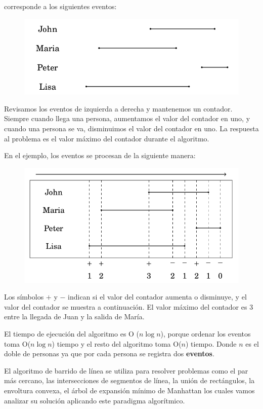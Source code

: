 corresponde a los siguientes eventos:

\begin{figure}[h!]
	\centering
	\includegraphics[width=0.5\linewidth]{img/example_sweep_line}
	\label{fig:examplesweepline}
\end{figure}

Revisamos los eventos de izquierda a derecha y mantenemos un contador. Siempre cuando llega una persona, aumentamos el valor del contador en uno, y cuando una persona se va, disminuimos el valor del contador en uno. La respuesta al problema es el valor máximo del contador durante el algoritmo.

En el ejemplo, los eventos se procesan de la siguiente manera:

\begin{figure}[h!]
	\centering
	\includegraphics[width=0.5\linewidth]{img/example_sweep_line2}
	\label{fig:examplesweepline2}
\end{figure}

Los símbolos $+$ y $-$ indican si el valor del contador aumenta o disminuye, y el valor del contador se muestra a continuación. El valor máximo del contador es 3 entre la llegada de Juan y la salida de María.

El tiempo de ejecución del algoritmo es O ($n\log n$), porque ordenar los eventos toma O($n\log n$) tiempo y el resto del algoritmo toma O($n$) tiempo. Donde $n$ es el doble de personas ya que por cada persona se registra dos \textbf{eventos}.

El algoritmo de barrido de línea se utiliza para resolver problemas como el par más cercano, las intersecciones de segmentos de línea, la unión de rectángulos, la envoltura convexa, el árbol de expansión mínimo de Manhattan los cuales vamos analizar su solución aplicando este paradigma algorítmico.

